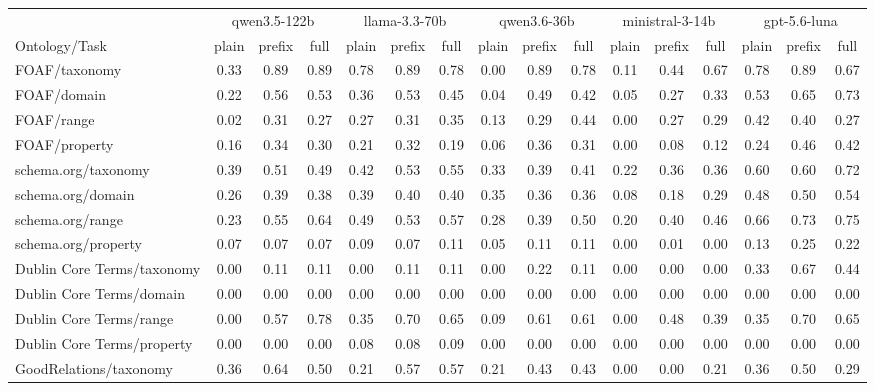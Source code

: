 \begin{tabular}{lccccccccccccccc}
\toprule
 & \multicolumn{3}{c}{qwen3.5-122b} & \multicolumn{3}{c}{llama-3.3-70b} & \multicolumn{3}{c}{qwen3.6-36b} & \multicolumn{3}{c}{ministral-3-14b} & \multicolumn{3}{c}{gpt-5.6-luna} \\
\cmidrule(lr){2-4} \cmidrule(lr){5-7} \cmidrule(lr){8-10} \cmidrule(lr){11-13} \cmidrule(lr){14-16}
Ontology/Task & plain & prefix & full & plain & prefix & full & plain & prefix & full & plain & prefix & full & plain & prefix & full \\
\midrule
FOAF/taxonomy & 0.33 & 0.89 & 0.89 & 0.78 & 0.89 & 0.78 & 0.00 & 0.89 & 0.78 & 0.11 & 0.44 & 0.67 & 0.78 & 0.89 & 0.67 \\
FOAF/domain & 0.22 & 0.56 & 0.53 & 0.36 & 0.53 & 0.45 & 0.04 & 0.49 & 0.42 & 0.05 & 0.27 & 0.33 & 0.53 & 0.65 & 0.73 \\
FOAF/range & 0.02 & 0.31 & 0.27 & 0.27 & 0.31 & 0.35 & 0.13 & 0.29 & 0.44 & 0.00 & 0.27 & 0.29 & 0.42 & 0.40 & 0.27 \\
FOAF/property & 0.16 & 0.34 & 0.30 & 0.21 & 0.32 & 0.19 & 0.06 & 0.36 & 0.31 & 0.00 & 0.08 & 0.12 & 0.24 & 0.46 & 0.42 \\
schema.org/taxonomy & 0.39 & 0.51 & 0.49 & 0.42 & 0.53 & 0.55 & 0.33 & 0.39 & 0.41 & 0.22 & 0.36 & 0.36 & 0.60 & 0.60 & 0.72 \\
schema.org/domain & 0.26 & 0.39 & 0.38 & 0.39 & 0.40 & 0.40 & 0.35 & 0.36 & 0.36 & 0.08 & 0.18 & 0.29 & 0.48 & 0.50 & 0.54 \\
schema.org/range & 0.23 & 0.55 & 0.64 & 0.49 & 0.53 & 0.57 & 0.28 & 0.39 & 0.50 & 0.20 & 0.40 & 0.46 & 0.66 & 0.73 & 0.75 \\
schema.org/property & 0.07 & 0.07 & 0.07 & 0.09 & 0.07 & 0.11 & 0.05 & 0.11 & 0.11 & 0.00 & 0.01 & 0.00 & 0.13 & 0.25 & 0.22 \\
Dublin Core Terms/taxonomy & 0.00 & 0.11 & 0.11 & 0.00 & 0.11 & 0.11 & 0.00 & 0.22 & 0.11 & 0.00 & 0.00 & 0.00 & 0.33 & 0.67 & 0.44 \\
Dublin Core Terms/domain & 0.00 & 0.00 & 0.00 & 0.00 & 0.00 & 0.00 & 0.00 & 0.00 & 0.00 & 0.00 & 0.00 & 0.00 & 0.00 & 0.00 & 0.00 \\
Dublin Core Terms/range & 0.00 & 0.57 & 0.78 & 0.35 & 0.70 & 0.65 & 0.09 & 0.61 & 0.61 & 0.00 & 0.48 & 0.39 & 0.35 & 0.70 & 0.65 \\
Dublin Core Terms/property & 0.00 & 0.00 & 0.00 & 0.08 & 0.08 & 0.09 & 0.00 & 0.00 & 0.00 & 0.00 & 0.00 & 0.00 & 0.00 & 0.00 & 0.00 \\
GoodRelations/taxonomy & 0.36 & 0.64 & 0.50 & 0.21 & 0.57 & 0.57 & 0.21 & 0.43 & 0.43 & 0.00 & 0.00 & 0.21 & 0.36 & 0.50 & 0.29 \\

\end{tabular}
